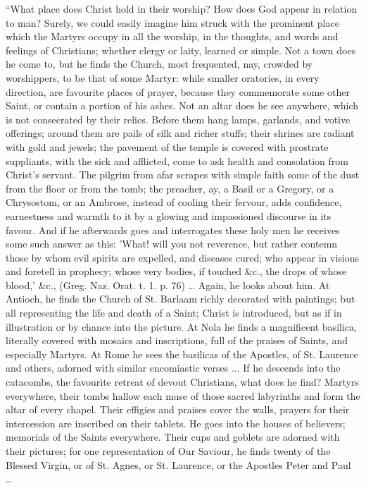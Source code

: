 ``What place does Christ hold in their worship?
How does God appear in relation to man? Surely, we could easily
imagine him struck with the prominent place which the Martyrs occupy
in all the worship, in the thoughts, and words and feelings of
Christians; whether clergy or laity, learned or simple. Not a town
does he come to, but he finds the Church, most frequented, nay,
crowded by worshippers, to be that of some Martyr: while smaller
oratories, in every direction, are favourite places of prayer, because
they commemorate some other Saint, or contain a portion of his ashes.
Not an altar does he see anywhere, which is not consecrated by their
relics. Before them hang lamps, garlands, and votive offerings; around
them are pails of silk and richer stuffs; their shrines are radiant
with gold and jewels; the pavement of the temple is covered with
prostrate suppliants, with the sick and afflicted, come to ask health
and consolation from Christ's servant. The pilgrim from afar scrapes
with simple faith some of the dust from the floor or from the tomb;
the preacher, ay, a Basil or a Gregory, or a Chrysostom, or an
Ambrose, instead of cooling their fervour, adds confidence,
earnestness and warmth to it by a glowing and impassioned discourse in
its favour. And if he afterwards goes and interrogates these holy men
he receives some such answer as this: 'What! will you not reverence,
but rather contemn those by whom evil spirits are expelled, and
diseases cured; who appear in visions and foretell in prophecy; whose
very bodies, if touched \&c., the drops of whose blood,' \&c.,
(Greg. Naz. Orat. t. 1. p. 76) … Again, he looks about him. At
Antioch, he finds the Church of St. Barlaam richly decorated with
paintings; but all representing the life and death of a Saint; Christ
is introduced, but as if in illustration or by chance into the
picture. At Nola he finds a magnificent basilica, literally covered
with mosaics and inscriptions, full of the praises of Saints, and
especially Martyrs. At Rome he sees the basilicas of the Apostles, of
St. Laurence and others, adorned with similar encomiastic verses ...
If he descends into the catacombs, the favourite retreat of devout
Christians, what does he find? Martyrs everywhere, their tombs hallow
each muse of those sacred labyrinths and form the altar of every
chapel. Their effigies and praises cover the walls, prayers for their
intercession are inscribed on their tablets. He goes into the houses
of believers; memorials of the Saints everywhere. Their cups and
goblets are adorned with their pictures; for one representation of Our
Saviour, he finds twenty of the Blessed Virgin, or of St. Agnes, or
St. Laurence, or the Apostles Peter and Paul …

